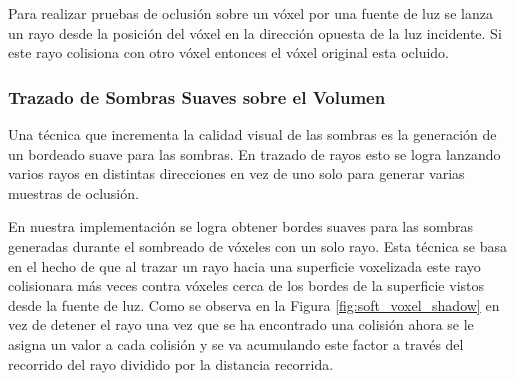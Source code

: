 Para realizar pruebas de oclusión sobre un vóxel por una fuente de luz se lanza un rayo desde la posición del vóxel en la dirección opuesta de la luz incidente. Si este rayo colisiona con otro vóxel entonces el vóxel original esta ocluido.

\subsubsection{Trazado de Sombras Suaves sobre el Volumen}

Una técnica que incrementa la calidad visual de las sombras es la generación de un bordeado suave para las sombras. En trazado de rayos esto se logra lanzando varios rayos en distintas direcciones en vez de uno solo para generar varias muestras de oclusión.

En nuestra implementación se logra obtener bordes suaves para las sombras generadas durante el sombreado de vóxeles con un solo rayo. Esta técnica se basa en el hecho de que al trazar un rayo hacia una superficie voxelizada este rayo colisionara más veces contra vóxeles cerca de los bordes de la superficie vistos desde la fuente de luz. Como se observa en la Figura \ref{fig:soft_voxel_shadow} en vez de detener el rayo una vez que se ha encontrado una colisión ahora se le asigna un valor a cada colisión y se va acumulando este factor a través del recorrido del rayo dividido por la distancia recorrida.

